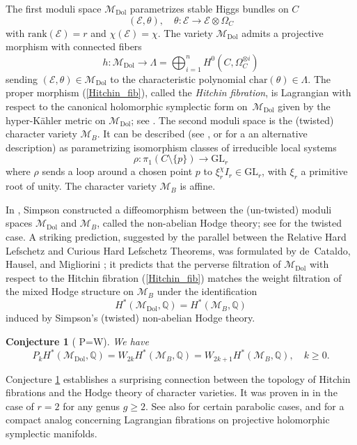 \documentclass[11pt]{amsart}
\theoremstyle{plain}
\newtheorem{conj}[thm]{Conjecture}
\theoremstyle{definition}
\theoremstyle{remark}
\newcommand{\BQ}{{\mathbb{Q}}}
\newcommand{\CE}{{\mathcal E}}
\newcommand{\CM}{{\mathcal M}}
\begin{document}
The first moduli space $\CM_{\mathrm{Dol}}$ parametrizes stable Higgs bundles on $C$
\[
(\CE, \theta), \quad \theta: \CE \to \CE \otimes \Omega_C
\]
with $\mathrm{rank}(\CE)=r$ and $\chi(\CE) =\chi$. The variety $\CM_{\mathrm{Dol}}$ admits a projective morphism with connected fibers
\begin{equation}\label{Hitchin_fib}
h: \CM_{\mathrm{Dol}} \rightarrow \Lambda = \bigoplus_{i=1}^n H^0(C, \Omega_C^{\otimes i})
\end{equation}
sending $(\CE, \theta) \in \CM_{\mathrm{Dol}}$ to the characteristic polynomial $\mathrm{char}(\theta) \in \Lambda$. The proper morphism (\ref{Hitchin_fib}), called the \emph{Hitchin fibration}, is Lagrangian with respect to the canonical holomorphic symplectic form on~$\CM_{\mathrm{Dol}}$ given by the hyper-K\"ahler metric on $\CM_{\mathrm{Dol}}$; see \cite{Hit1}.  
The second moduli space is the  (twisted) character variety $\CM_B$. It  can be described (see \cite{HT1}, or  \cite{Shende} for a an alternative description) as parametrizing isomorphism classes of irreducible local systems
\[
\rho: \pi_1(C \setminus \{p\}) \to \mathrm{GL}_r
\]
where $\rho$ sends a loop around a chosen point $p$ to $\xi^\chi_r I_r \in \mathrm{GL}_r$, with $\xi_r$ a primitive root of unity. The character variety $\CM_B$ is affine. 

In \cite{Simp}, Simpson constructed a diffeomorphism between the (un-twisted) moduli spaces 
$\CM_{\mathrm{Dol}}$ and $\CM_B$, called the non-abelian Hodge theory;  see \cite{HT1} for the twisted case.  A striking 
prediction, suggested by the parallel between the Relative Hard Lefschetz \cite{BBD} and 
Curious Hard Lefschetz \cite{HRV} Theorems, was formulated by de~Cataldo, Hausel, and Migliorini \cite{dCHM1}; it predicts that the perverse filtration of $\CM_{\mathrm{Dol}}$ with respect to the Hitchin fibration (\ref{Hitchin_fib}) matches the weight filtration of the mixed Hodge structure on $\mathcal{M}_B$ under the identification
\[
H^\ast(\CM_{\mathrm{Dol}}, \BQ) = H^\ast(\CM_B, \BQ) 
\]
induced by Simpson's  (twisted) non-abelian Hodge theory.

\begin{conj}[\cite{dCHM1} P=W] \label{P=W_conj}
We have
\[
P_kH^\ast(\CM_{\mathrm{Dol}}, \BQ) = W_{2k}H^\ast(\CM_{B}, \BQ)= W_{2k+1}H^\ast(\CM_{B}, \BQ), \quad k \geq 0.
\]
\end{conj}

Conjecture \ref{P=W_conj} establishes a surprising connection between the topology of Hitchin fibrations and the Hodge theory of character varieties. It was proven in \cite{dCHM1} in the case of $r=2$ for any genus $g \geq 2$. See also \cite{dCHM3, SZ, Z} for certain parabolic cases, and \cite{SY, HLSY} for a compact analog concerning Lagrangian fibrations on projective holomorphic symplectic manifolds. 
\end{document}
